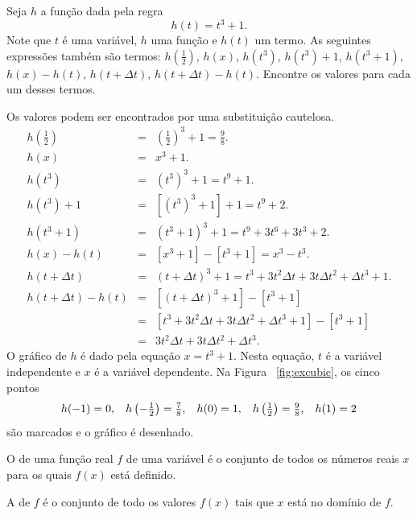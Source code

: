 \begin{example}\label{ex:distinctfunc}
Seja $h$ a função dada pela regra
\[
  h(t) = t^3 + 1.
\]
Note que $t$ é uma variável, $h$ uma função e $h(t)$ um termo.
As seguintes expressões também são termos: $h\left(\frac{1}{2}\right)$,
$h(x)$, $h(t^3)$, $h(t^3) + 1$, $h(t^3+1)$, $h(x) - h(t)$, $h(t + \Delta t)$,
$h(t+\Delta t) - h(t)$. Encontre os valores para cada um desses termos.

Os valores podem ser encontrados por uma substituição cautelosa.
\begin{eqnarray*}
  h\left(\frac{1}{2}\right) & = & \left(\frac{1}{2}\right)^3 + 1 = \frac{9}{8}. \\
  h(x) & = & x^3 + 1. \\
  h(t^3) & = & \left(t^3\right)^3 + 1 = t^9 + 1. \\
  h(t^3) + 1 & = & \left[ \left( t^3 \right)^3 + 1 \right] + 1 = t^9 + 2. \\
  h(t^3 +  1) & = & \left( t^3 + 1 \right)^3 + 1 = t^9 + 3t^6 + 3t^3 + 2. \\
  h(x) - h(t) & = & \left[ x^3 + 1 \right] - \left[ t^3 + 1 \right] =
                    x^3 - t^3. \\
  h(t + \Delta t) & = & (t + \Delta t)^3 + 1 = t^3 + 3t^2 \Delta t +
                        3t \Delta t^2 + \Delta t^3 + 1. \\
  h(t + \Delta t) - h(t) & = &
                \left[ (t + \Delta t)^3 + 1 \right] -
                \left[ t^3 + 1 \right] \\
                         & = &
                \left[ t^3 + 3t^2 \Delta t +
                       3t \Delta t^2 + \Delta t^3 + 1 \right] -
                \left[ t^3 + 1 \right] \\
                         & = & 3t^2 \Delta t + 3t \Delta t^2 + \Delta t^3.
\end{eqnarray*}
O gráfico de $h$ é dado pela equação $x = t^3 + 1$. Nesta equação,
$t$ é a variável independente e $x$ é a variável dependente. Na Figura~%
\ref{fig:excubic}, os cinco pontos
\[
\textstyle
  h(-1) = 0, \hspace{2ex} h\left(-\frac{1}{2}\right) = \frac{7}{8}, \hspace{2ex}
  h(0) = 1, \hspace{2ex} h\left(\frac{1}{2}\right) = \frac{9}{8}, \hspace{2ex}
  h(1) = 2
\]
são marcados e o gráfico é desenhado.
\end{example}


\begin{defin}
O  de uma função real $f$ de uma variável é o conjunto
de todos os números reais $x$ para os quais $f(x)$ está definido.

A  de $f$ é o conjunto de todo os valores $f(x)$
tais que $x$ está no domínio de $f$.
\end{defin}

